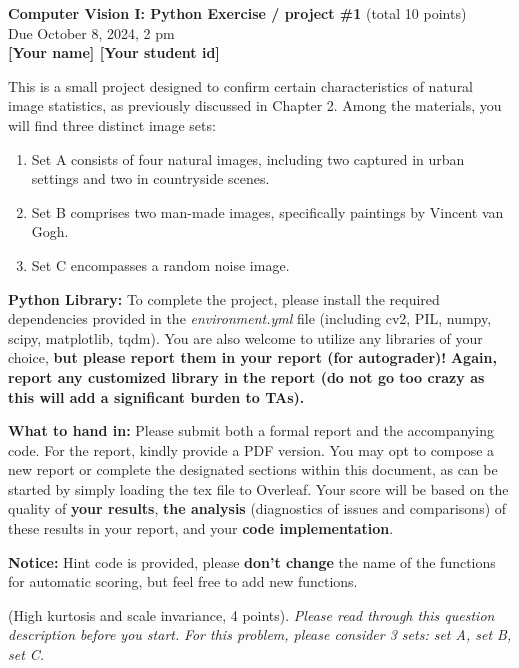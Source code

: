 \documentclass[11pt]{article}
\begin{document}
\begin{center}
{\bf Computer Vision I: Python Exercise / project \#1 } (total 10 points)\\
Due October 8, 2024, 2 pm\\

{\bf [Your name] [Your student id]}
\end{center}

This is a small project designed to confirm certain characteristics of natural image statistics, as previously discussed in Chapter 2. Among the materials, you will find three distinct image sets:
\begin{enumerate}
 \item Set A consists of four natural images, including two captured in urban settings and two in countryside scenes.
 \item Set B comprises two man-made images, specifically paintings by Vincent van Gogh.
 \item Set C encompasses a random noise image.
\end{enumerate}


{\bf Python Library:} To complete the project, please install the required dependencies provided in the \textit{environment.yml} file (including cv2, PIL, numpy, scipy, matplotlib, tqdm). You are also welcome to utilize any libraries of your choice, \textbf{but please report them in your report (for autograder)!}
\color{red}
\textbf{Again, report any customized library in the report (do not go too crazy as this will add a significant burden to TAs).}
\color{black}

 {\bf What to hand in:} Please submit both a formal report and the accompanying code. For the report, kindly provide a PDF version. You may opt to compose a new report or complete the designated sections within this document, as can be started by simply loading the tex file to Overleaf. Your score will be based on the quality of \textbf{your results}, \textbf{the analysis} (diagnostics of issues and comparisons) of these results in your report, and your \textbf{code implementation}.

 {\bf Notice:} Hint code is provided, please \textbf{don't change} the name of the functions for automatic scoring, but feel free to add new functions.

\clearpage

 (High kurtosis and scale invariance, 4 points). \emph{Please read through this question description before you start.} \emph{For this problem, please consider 3 sets: set A, set B, set C.} 
\end{document}
